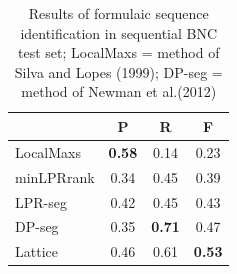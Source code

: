 \documentclass[11pt,letterpaper]{article}
\makeatletter
\def \al {al.\@ }
\makeatother
\begin{document}
 \begin{table}[!bt]
 
 \begin{center}
  \caption{ Results of formulaic sequence identification in sequential BNC test set; LocalMaxs = method of Silva and Lopes (1999); DP-seg = method of Newman et \al (2012)}
	\label{tab:BNC}
	
	 \begin{tabular}{lccc}

       \hline
			& P & R & F\\
			 \hline
			LocalMaxs & \bf{0.58} & 0.14 & 0.23 \\
			minLPRrank & 0.34 & 0.45 & 0.39 \\
			LPR-seg & 0.42 & 0.45 & 0.43 \\
			DP-seg & 0.35 & \bf{0.71} & 0.47 \\
			Lattice & 0.46 & 0.61 & \bf{0.53} \\
       \hline
 \end{tabular}

 \end{center}

 \end{table}	




\end{document}
